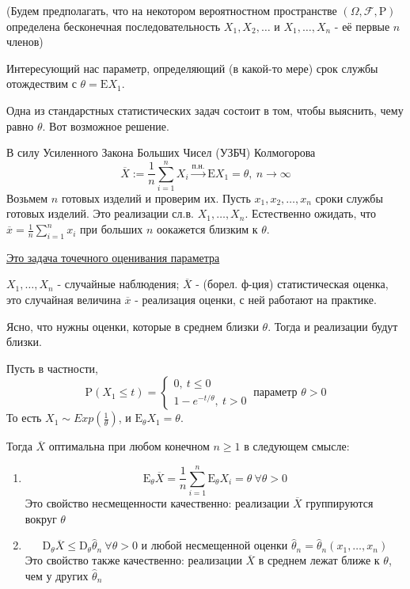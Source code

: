 \documentclass[12pt]{article}
\theoremstyle{basic_theorem}
\theoremstyle{name_theorem}
\def\E{
    \mathrm{E}
}
\def\D{
    \mathrm{D}
}
\def\P{
    \mathrm{P}
}
\def\F{
    \mathcal{F}
}
\begin{document}
    (Будем предполагать, что на некотором вероятностном пространстве $(\Omega, \F, \P)$
    определена бесконечная последовательность $X_1, X_2, \ldots$ и $X_1, \ldots, X_n$ - её
    первые $n$ членов)

    Интересующий нас параметр, определяющий (в какой-то мере) срок службы
    отождествим с $\theta = \E X_1$.

    Одна из стандарстных статистических задач состоит в том, чтобы выяснить,
    чему равно $\theta$. Вот возможное решение.

    В силу Усиленного Закона Больших Чисел (УЗБЧ) Колмогорова
    $$\overline{X} := \frac{1}{n} \sum^n_{i=1}X_i\xrightarrow{\text{п.н.}} \E X_1=\theta,\ n\rightarrow\infty$$ 
    Возьмем $n$ готовых изделий и проверим их. Пусть $x_1, x_2, \ldots, x_n$ сроки службы
    готовых изделий. Это реализации сл.в. $X_1, \ldots, X_n$. Естественно ожидать,
    что $\overline{x}=\frac{1}{n}\sum_{i=1}^nx_i$ при больших $n$ оокажется близким к $\theta$.

    \underline{Это задача точечного оценивания параметра}

    $X_1, \ldots, X_n$ - случайные наблюдения; $\overline{X}$ - (борел. ф-ция) статистическая
    оценка, это случайная величина $\overline{x}$ - реализация оценки,
    с ней работают на практике.

    Ясно, что нужны оценки, которые в среднем близки $\theta$.
    Тогда и реализации будут близки.

    Пусть в частности, 
    $$\P(X_1 \leq t) = \begin{cases}
        0,\ t \leq 0 \\
        1 - e^{-t/\theta},\ t > 0
    \end{cases}\ \text{параметр } \theta > 0$$
    То есть $X_1\sim Exp(\frac{1}{\theta})$,
    и $\E_\theta X_1=\theta$.

    Тогда $\overline{X}$ оптимальна при любом конечном $n\geq 1$
    в следующем смысле:
    \begin{enumerate}
        \item $$\E_\theta\overline{X} = \frac{1}{n}\sum_{i=1}^n\E_\theta X_i=\theta \ \forall\theta > 0$$
            Это свойство несмещенности качественно: реализации $\overline{X}$ группируются
            вокруг $\theta$
        \item $$\D_\theta\overline{X}\leq\D_\theta\hat{\theta}_n
            \ \forall\theta>0 \text{ и любой несмещенной оценки } \hat{\theta}_n=\hat{\theta}_n(x_1,\ldots,x_n)$$
            Это свойство также качественно: реализации $\overline{X}$
            в среднем лежат ближе к $\theta$, чем у других $\hat{\theta}_n$ 
    \end{enumerate}
\end{document}
